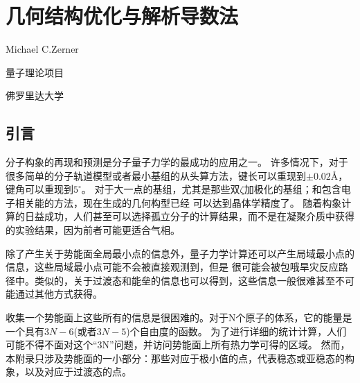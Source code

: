 \chapter{几何结构优化与解析导数法}

Michael C.Zerner

量子理论项目

佛罗里达大学

\section{引言}

分子构象的再现和预测是分子量子力学的最成功的应用之一。
许多情况下，对于很多简单的分子轨道模型或者最小基组的从头算方法，键长可以重现到$\pm 0.02$\r A，
键角可以重现到$5^{\circ}$。
对于大一点的基组，尤其是那些双$\zeta$加极化的基组；和包含电子相关能的方法，现在生成的几何构型已经
可以达到晶体学精度了。
随着构象计算的日益成功，人们甚至可以选择孤立分子的计算结果，而不是在凝聚介质中获得的实验结果，因为前者可能更适合气相。

除了产生关于势能面全局最小点的信息外，量子力学计算还可以产生局域最小点的信息，这些局域最小点可能不会被直接观测到，但是
很可能会被包哦旱灾反应路径中。类似的，关于过渡态和能垒的信息也可以得到，这些信息一般很难甚至不可能通过其他方式获得。

收集一个势能面上这些所有的信息是很困难的。对于N个原子的体系，它的能量是一个具有$3N-6$(或者$3N-5$)个自由度的函数。
为了进行详细的统计计算，人们可能不得不面对这个“3N”问题，并访问势能面上所有热力学可得的区域。
然而，本附录只涉及势能面的一小部分：那些对应于极小值的点，代表稳态或亚稳态的构象，以及对应于过渡态的点。
